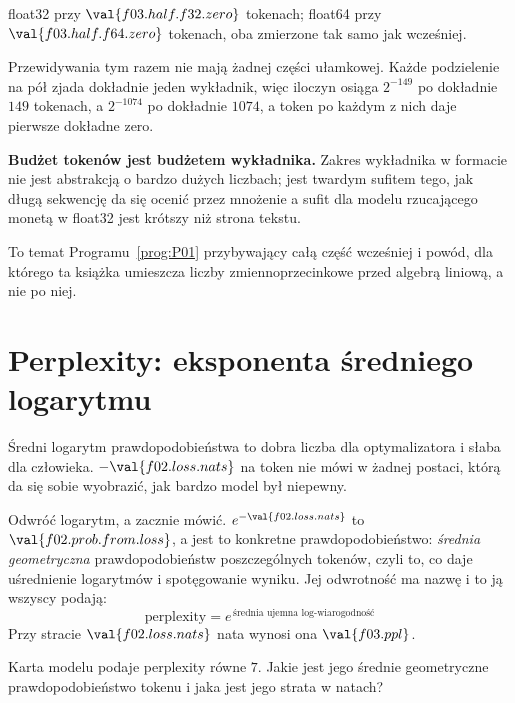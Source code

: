 \begin{fr}
\begin{ansblock}
float32 przy $\val{f03.half.f32.zero}$ tokenach; float64 przy
$\val{f03.half.f64.zero}$ tokenach, oba zmierzone tak samo jak wcześniej.

Przewidywania tym razem nie mają żadnej części ułamkowej. Każde podzielenie na
pół zjada dokładnie jeden wykładnik, więc iloczyn osiąga $2^{-149}$ po
dokładnie $149$ tokenach, a $2^{-1074}$ po dokładnie $1074$, a token po każdym
z nich daje pierwsze dokładne zero.
\end{ansblock}

\textbf{Budżet tokenów jest budżetem wykładnika.} Zakres wykładnika w formacie
nie jest abstrakcją o bardzo dużych liczbach; jest twardym sufitem tego, jak
długą sekwencję da się ocenić przez mnożenie \dash{} a sufit dla modelu
rzucającego monetą w float32 jest krótszy niż strona tekstu.

To temat Programu~\ref{prog:P01} przybywający całą część wcześniej i powód,
dla którego ta książka umieszcza liczby zmiennoprzecinkowe przed algebrą
liniową, a nie po niej.
\end{fr}

\section{Perplexity: eksponenta średniego logarytmu}
\label{sec:F03-perplexity}

\begin{fr}
Średni logarytm prawdopodobieństwa to dobra liczba dla optymalizatora i słaba
dla człowieka. $-\val{f02.loss.nats}$ na token nie mówi w żadnej postaci, którą
da się sobie wyobrazić, jak bardzo model był niepewny.

Odwróć logarytm, a zacznie mówić. $e^{-\val{f02.loss.nats}}$ to
$\val{f02.prob.from.loss}$, a jest to konkretne prawdopodobieństwo:
\emph{średnia geometryczna} prawdopodobieństw poszczególnych tokenów, czyli to,
co daje uśrednienie logarytmów i spotęgowanie wyniku. Jej odwrotność ma nazwę i
to ją wszyscy podają:
\[ \text{perplexity} = e^{\,\text{średnia ujemna log-wiarogodność}} \]
Przy stracie $\val{f02.loss.nats}$ nata wynosi ona $\val{f03.ppl}$.

Karta modelu podaje perplexity równe $7$. Jakie jest jego średnie geometryczne
prawdopodobieństwo tokenu i jaka jest jego strata w natach?
\nextframe
\end{fr}

